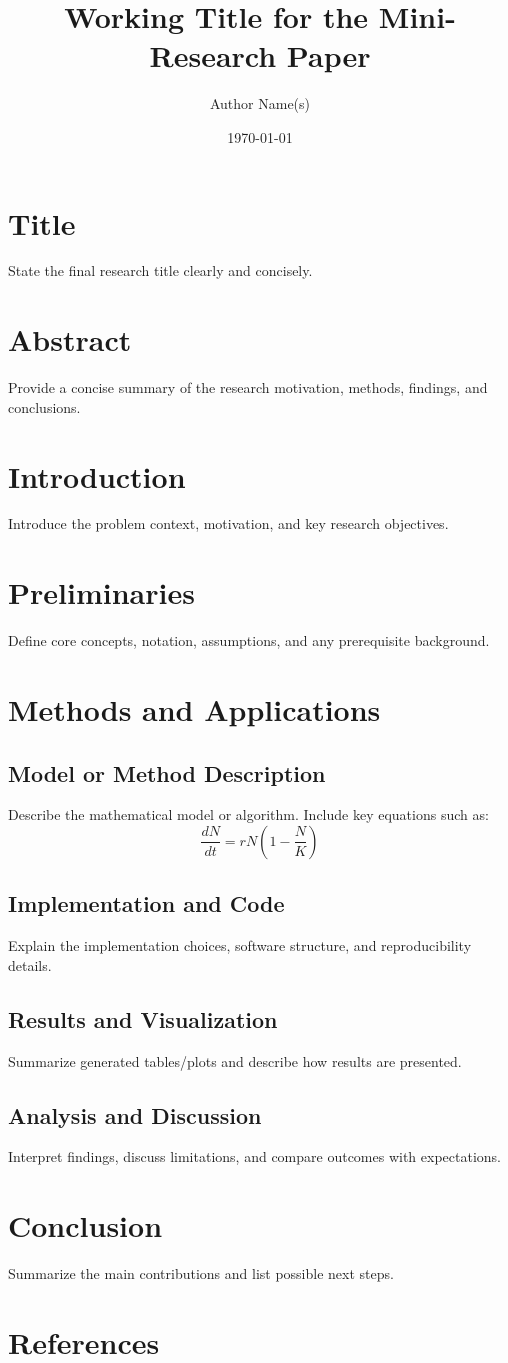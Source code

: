 \documentclass[12pt]{article}
\title{Working Title for the Mini-Research Paper}
\author{Author Name(s)}
\date{\today}
\begin{document}
\maketitle

\section*{Title}
State the final research title clearly and concisely.

\section*{Abstract}
Provide a concise summary of the research motivation, methods, findings, and conclusions.

\section{Introduction}
Introduce the problem context, motivation, and key research objectives.

\section{Preliminaries}
Define core concepts, notation, assumptions, and any prerequisite background.

\section{Methods and Applications}

\subsection{Model or Method Description}
Describe the mathematical model or algorithm. Include key equations such as:
\[
\frac{dN}{dt} = rN\left(1 - \frac{N}{K}\right)
\]

\subsection{Implementation and Code}
Explain the implementation choices, software structure, and reproducibility details.

\subsection{Results and Visualization}
Summarize generated tables/plots and describe how results are presented.

\subsection{Analysis and Discussion}
Interpret findings, discuss limitations, and compare outcomes with expectations.

\section{Conclusion}
Summarize the main contributions and list possible next steps.

\section*{References}
\printbibliography[heading=none]
\end{document}
